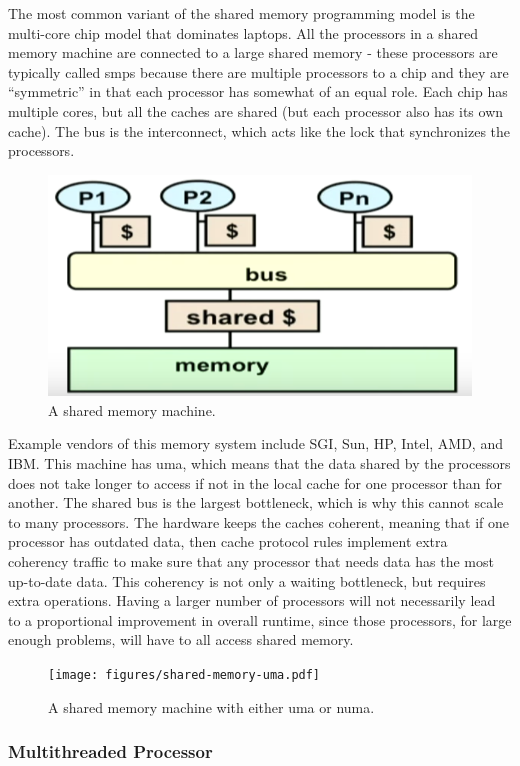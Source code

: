 \documentclass[10pt]{article}
\begin{document}
\begin{flushleft}
The most common variant of the shared memory programming model is the multi-core chip model that dominates laptops. All the processors in a shared memory machine are connected to a large shared memory - these processors are typically called \gls{smp}s because there are multiple processors to a chip and they are ``symmetric'' in that each processor has somewhat of an equal role. Each chip has multiple cores, but all the caches are shared (but each processor also has its own cache). The bus is the interconnect, which acts like the lock that synchronizes the processors.

\begin{figure}[H]
\centering
\includegraphics[width=0.5\linewidth]{figures/shared-memory.pdf}
\caption{A shared memory machine.}
\end{figure}

Example vendors of this memory system include SGI, Sun, HP, Intel, AMD, and IBM. This machine has \gls{uma}, which means that the data shared by the processors does not take longer to access if not in the local cache for one processor than for another. The shared bus is the largest bottleneck, which is why this cannot scale to many processors. The hardware keeps the caches coherent, meaning that if one processor has outdated data, then cache protocol rules implement extra coherency traffic to make sure that any processor that needs data has the most up-to-date data. This coherency is not only a waiting bottleneck, but requires extra operations. Having a larger number of processors will not necessarily lead to a proportional improvement in overall runtime, since those processors, for large enough problems, will have to all access shared memory.

\begin{figure}[H]
\centering
\texttt{[image: figures/shared-memory-uma.pdf]}
\caption{A shared memory machine with either \gls{uma} or \gls{numa}.}
\end{figure}

\subsubsection{Multithreaded Processor}


\end{flushleft}
\end{document}
